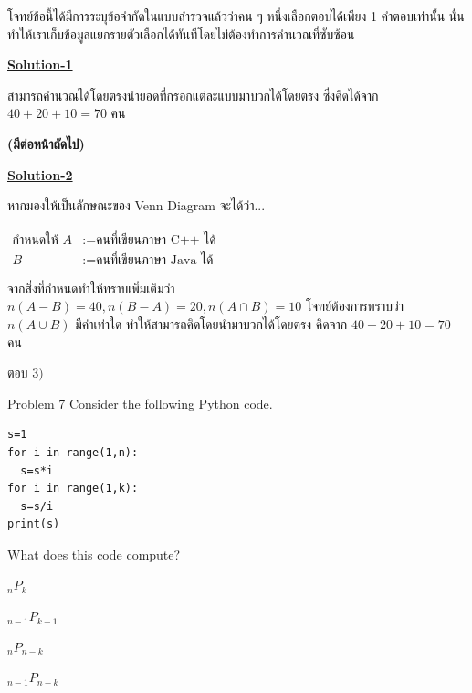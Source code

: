 \documentclass[11pt]{scrartcl}
\begin{document}
\begin{solutionbox}
  โจทย์ข้อนี้ได้มีการระบุข้อจำกัดในแบบสำรวจแล้วว่าคน ๆ หนึ่งเลือกตอบได้เพียง 1 คำตอบเท่านั้น นั่นทำให้เราเก็บข้อมูลแยกรายตัวเลือกได้ทันทีโดยไม่ต้องทำการคำนวณที่ซับซ้อน

  \underline{\textbf{Solution-1}}
 
  สามารถคำนวณได้โดยตรงนำยอดที่กรอกแต่ละแบบมาบวกได้โดยตรง ซึ่งคิดได้จาก $40+20+10 = 70$ คน

  \vspace{0.5cm}
  \textbf{(มีต่อหน้าถัดไป)}

  \newpage
  \underline{\textbf{Solution-2}}

  หากมองให้เป็นลักษณะของ Venn Diagram จะได้ว่า...
  \begin{flushleft}
  $\begin{aligned}
    \text{กำหนดให้ } A &:= \text{คนที่เขียนภาษา C++ ได้} \\
    B &:= \text{คนที่เขียนภาษา Java ได้}
  \end{aligned}$
  \end{flushleft}

  จากสิ่งที่กำหนดทำให้ทราบเพิ่มเติมว่า $n(A-B) = 40, n(B-A) = 20, n(A \cap B) = 10$ 
  โจทย์ต้องการทราบว่า $n(A \cup B)$ มีค่าเท่าใด ทำให้สามารถคิดโดยนำมาบวกได้โดยตรง คิดจาก $40+20+10 = 70$ คน
  
  ตอบ $\boxed{3)}$
\end{solutionbox}

\begin{problembox}{Problem 7}
Consider the following Python code.
\begin{lstlisting}
s=1
for i in range(1,n):
  s=s*i
for i in range(1,k):
  s=s/i
print(s)
\end{lstlisting}
What does this code compute?
\begin{choices}
\item $_n P_k$
\item $_{n-1} P_{k-1}$
\item $_n P_{n-k}$
\item $_{n-1} P_{n-k}$
\end{choices}
\end{problembox}
\end{document}
